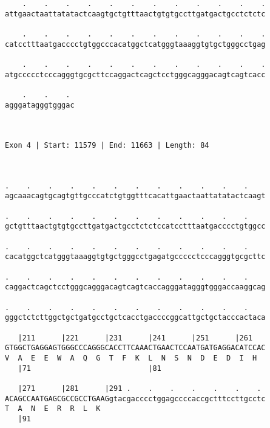 \documentclass{article}
\begin{document}
\begin{Verbatim}
    .    .    .    .    .    .    .    .    .    .    .    .
attgaactaattatatactcaagtgctgtttaactgtgtgccttgatgactgcctctctc
                                                            
    .    .    .    .    .    .    .    .    .    .    .    .
catcctttaatgacccctgtggcccacatggctcatgggtaaaggtgtgctgggcctgag
                                                            
    .    .    .    .    .    .    .    .    .    .    .    .
atgccccctcccagggtgcgcttccaggactcagctcctgggcagggacagtcagtcacc
                                                            
    .    .    . 
agggatagggtgggac
                
                
 
Exon 4 | Start: 11579 | End: 11663 | Length: 84



.    .    .    .    .    .    .    .    .    .    .    .    
agcaaacagtgcagtgttgcccatctgtggtttcacattgaactaattatatactcaagt
                                                            
.    .    .    .    .    .    .    .    .    .    .    .    
gctgtttaactgtgtgccttgatgactgcctctctccatcctttaatgacccctgtggcc
                                                            
.    .    .    .    .    .    .    .    .    .    .    .    
cacatggctcatgggtaaaggtgtgctgggcctgagatgccccctcccagggtgcgcttc
                                                            
.    .    .    .    .    .    .    .    .    .    .    .    
caggactcagctcctgggcagggacagtcagtcaccagggatagggtgggaccaaggcag
                                                            
.    .    .    .    .    .    .    .    .    .    .    .    
gggctctcttggctgctgatgcctgctcacctgaccccggcattgctgctacccactaca
                                                            
   |211      |221      |231      |241      |251      |261   
GTGGCTGAGGAGTGGGCCCAGGGCACCTTCAAACTGAACTCCAATGATGAGGACATCCAC
V  A  E  E  W  A  Q  G  T  F  K  L  N  S  N  D  E  D  I  H  
   |71                           |81                        
  
   |271      |281      |291 .    .    .    .    .    .    . 
ACAGCCAATGAGCGCCGCCTGAAGgtacgacccctggagccccaccgctttccttgcctc
T  A  N  E  R  R  L  K                                      
   |91                                                      
  

\end{Verbatim}
\end{document}
